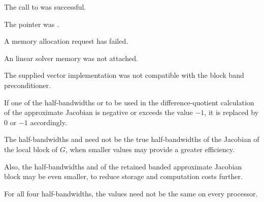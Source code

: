 {{  \begin{args}
  \item[\id{IDALS\_SUCCESS}]
    The call to  was successful.
  \item[\id{IDALS\_MEM\_NULL}]
    The  pointer was .
  \item[\Id{IDALS\_MEM\_FAIL}]
    A memory allocation request has failed.
  \item[\Id{IDALS\_LMEM\_NULL}]
    An {\idals} linear solver memory was not attached.
  \item[\Id{IDALS\_ILL\_INPUT}]
    The supplied vector implementation was not compatible with the block band preconditioner.
  \end{args}
}
{
  If one of the half-bandwidths  or  to be used in the
  difference-quotient calculation of the approximate Jacobian is negative or
  exceeds the value $-1$, it is replaced by 0 or $-1$
  accordingly.

  The half-bandwidths  and  need not be the true
  half-bandwidths of the Jacobian of the local block of $G$,
  when smaller values may provide a greater efficiency.

  Also, the half-bandwidths  and  of the retained
  banded approximate Jacobian block may be even smaller,
  to reduce storage and computation costs further.

  For all four half-bandwidths, the values need not be the
  same on every processor.
}



}
